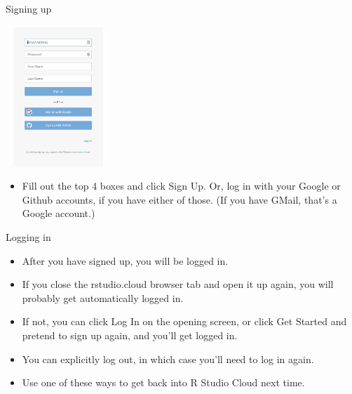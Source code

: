 \documentclass[ignorenonframetext,]{beamer}
\providecommand{\tightlist}{%
  \setlength{\itemsep}{0pt}\setlength{\parskip}{0pt}}
\begin{document}
\begin{frame}{Signing up}
\protect\hypertarget{signing-up}{}

\includegraphics[width=\textwidth,height=2.08333in]{Screenshot_2018-06-29_15-08-57.png}

\begin{itemize}
\tightlist
\item
  Fill out the top 4 boxes and click Sign Up. Or, log in with your
  Google or Github accounts, if you have either of those. (If you have
  GMail, that's a Google account.)
\end{itemize}

\end{frame}

\begin{frame}{Logging in}
\protect\hypertarget{logging-in}{}

\begin{itemize}
\tightlist
\item
  After you have signed up, you will be logged in.
\item
  If you close the rstudio.cloud browser tab and open it up again, you
  will probably get automatically logged in.
\item
  If not, you can click Log In on the opening screen, or click Get
  Started and pretend to sign up again, and you'll get logged in.
\item
  You can explicitly log out, in which case you'll need to log in again.
\item
  Use one of these ways to get back into R Studio Cloud next time.
\end{itemize}

\end{frame}
\end{document}

